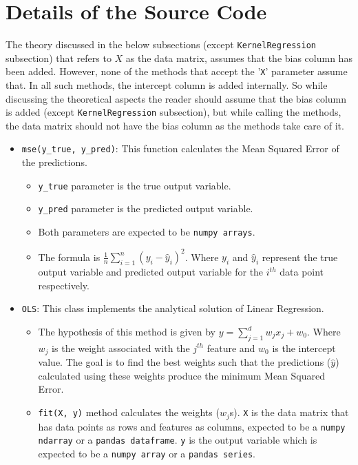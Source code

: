 \documentclass[a4paper]{article}
\begin{document}
\section{Details of the Source Code}
The theory discussed in the below subsections (except \verb|KernelRegression| subsection) that refers to $X$ as the data matrix, assumes that the bias column has been added. However, none of the methods that accept the '\verb|X|' parameter assume that. In all such methods, the intercept column is added internally. So while discussing the theoretical aspects the reader should assume that the bias column is added (except \verb|KernelRegression| subsection), but while calling the methods, the data matrix should not have the bias column as the methods take care of it.
\begin{itemize}
    \item \verb|mse(y_true, y_pred)|: This function calculates the Mean Squared Error of the predictions. 
    \begin{itemize}
        \item \verb|y_true| parameter is the true output variable.
        
        \item \verb|y_pred| parameter is the predicted output variable.
        
        \item Both parameters are expected to be \verb|numpy arrays|.
        
        \item The formula is $\frac{1}{n} \displaystyle \sum_{i=1}^n (y_i - \hat{y}_i)^2$. Where $y_i$ and $\hat{y}_i$ represent the true output variable and predicted output variable for the $i^{th}$ data point respectively. 
    \end{itemize}

    \item \verb|OLS|: This class implements the analytical solution of Linear Regression.
    \begin{itemize}
        \item The hypothesis of this method is given by $y= \displaystyle \sum_{j=1}^d w_jx_j + w_0$. Where $w_j$ is the weight associated with the $j^{th}$ feature and $w_0$ is the intercept value. The goal is to find the best weights such that the predictions ($\hat{y}$) calculated using these weights produce the minimum Mean Squared Error.
        
        \item \verb|fit(X, y)| method calculates the weights ($w_j$s). \verb|X| is the data matrix that has data points as rows and features as columns, expected to be a \verb|numpy ndarray| or a \verb|pandas dataframe|. \verb|y| is the output variable which is expected to be a \verb|numpy array| or  a \verb|pandas series|.
        

\end{itemize}
\end{itemize}
\end{document}
